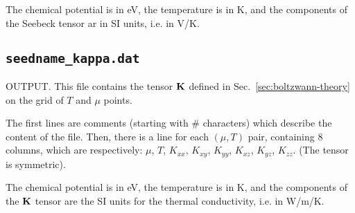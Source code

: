 The chemical potential is in eV, the temperature is in K, and the components of the Seebeck tensor ar in SI units, i.e. in V/K.

\subsection{{\tt seedname\_kappa.dat}}
OUTPUT. This file contains the tensor $\bm{\mathrm{K}}$ defined in Sec.~\ref{sec:boltzwann-theory} on the grid of $T$ and $\mu$ points.

The first lines are comments (starting with \# characters) which describe the content of the file.
Then, there is a line for each $(\mu,T)$ pair, containing 8 columns, which are respectively: $\mu$, $T$, $K_{xx}$, $K_{xy}$, $K_{yy}$, $K_{xz}$, $K_{yz}$, $K_{zz}$. (The tensor is symmetric).

The chemical potential is in eV, the temperature is in K, and the components of the $\bm{\mathrm{K}}$ tensor are the SI units for the thermal conductivity, i.e. in W/m/K.





